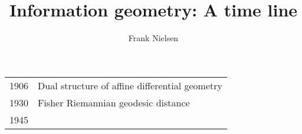 \documentclass{article}
\title{Information geometry: A time line}
\author{Frank Nielsen}
\date{}
\begin{document}
\maketitle

\begin{longtable}{ll}
1906 & Dual structure of affine differential geometry\\
1930 & Fisher Riemannian geodesic distance\\
1945 & 
\end{longtable}




\end{document}
